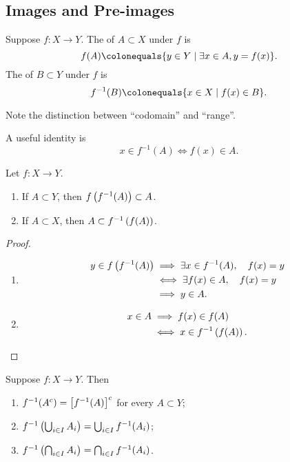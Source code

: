 \subsection{Images and Pre-images}
\begin{definition}
Suppose $f\colon X\to Y$. The  of $A\subset X$ under $f$ is
\[f(A)\colonequals\{y\in Y\mid\exists x\in A, y=f(x)\}.\]
The  of $B\subset Y$ under $f$ is
\[f^{-1}(B)\colonequals\{x\in X\mid f(x)\in B\}.\]
\end{definition}

\begin{remark}
Note the distinction between ``codomain'' and ``range''.
\end{remark}

A useful identity is
\[x\in f^{-1}(A)\iff f(x)\in A.\]

\begin{lemma}
Let $f\colon X\to Y$.
\begin{enumerate}[label=(\roman*)]
\item If $A\subset Y$, then $f\left(f^{-1}(A)\right)\subset A$.
\item If $A\subset X$, then $A\subset f^{-1}\left(f(A)\right)$.
\end{enumerate}
\end{lemma}

\begin{proof} \
\begin{enumerate}[label=(\roman*)]
\item \begin{align*}
y\in f\left(f^{-1}(A)\right)
&\implies\exists x\in f^{-1}(A),\quad f(x)=y\\
&\iff\exists f(x)\in A,\quad f(x)=y\\
&\implies y\in A.
\end{align*}

\item \begin{align*}
x\in A&\implies f(x)\in f(A)\\
&\iff x\in f^{-1}\left(f(A)\right).
\end{align*}
\end{enumerate}
\end{proof}

\begin{lemma}
Suppose $f\colon X\to Y$. Then
\begin{enumerate}[label=(\roman*)]
\item $f^{-1}(A^c)=\left[f^{-1}(A)\right]^c$ for every $A\subset Y$;
\item $f^{-1}\left(\bigcup_{i\in I}A_i\right)=\bigcup_{i\in I}f^{-1}(A_i)$;
\item $f^{-1}\left(\bigcap_{i\in I}A_i\right)=\bigcap_{i\in I}f^{-1}(A_i)$.
\end{enumerate}
\end{lemma}

